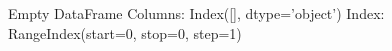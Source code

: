 \begin{tabular}{}
\toprule
Empty DataFrame
Columns: Index([], dtype='object')
Index: RangeIndex(start=0, stop=0, step=1) \\
\bottomrule
\end{tabular}
